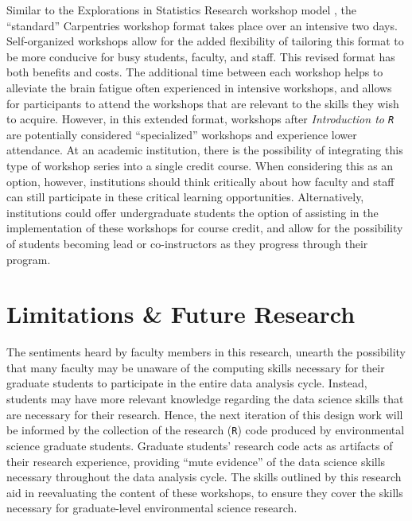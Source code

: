 \documentclass[12pt]{article}
\begin{document}
\quad Similar to the Explorations in Statistics Research workshop model 
\citep{esr}, the ``standard'' Carpentries workshop format takes place over an 
intensive two days. Self-organized workshops allow for the added flexibility of 
tailoring this format to be more conducive for busy students, faculty, and
staff. This revised format has both benefits and costs. The additional time
between each workshop helps to alleviate the brain fatigue often experienced in
intensive workshops, and allows for participants to attend the workshops that 
are relevant to the skills they wish to acquire. However, in this extended
format, workshops after \emph{Introduction to \texttt{R}} are potentially
considered ``specialized'' workshops and experience lower attendance. At an
academic institution, there is the possibility of integrating this type of 
workshop series into a single credit course. When considering this as an option, 
however, institutions should think critically about how faculty and staff can 
still participate in these critical learning opportunities. Alternatively,
institutions could offer undergraduate students the option of assisting in the 
implementation of these workshops for course credit, and allow for the
possibility of students becoming lead or co-instructors as they progress through
their program. 

\section{Limitations \& Future Research} 
\label{sec:future}

\quad The sentiments heard by faculty members in this research, unearth the
possibility that many faculty may be unaware of the computing skills necessary
for their graduate students to participate in the entire data analysis cycle.
Instead, students may have more relevant knowledge regarding the data science
skills that are necessary for their research. Hence, the next iteration of this
design work will be informed by the collection of the research (\texttt{R}) code
produced by environmental science graduate students. Graduate students' research
code acts as artifacts of their research experience, providing ``mute evidence''
\citep{hodder} of the data science skills necessary throughout the data analysis
cycle. The skills outlined by this research aid in reevaluating the content of
these workshops, to ensure they cover the skills necessary for graduate-level
environmental science research. 
\end{document}
